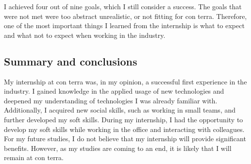 \documentclass[11pt, titlepage, a4paper]{article}
\begin{document}
 I achieved four out of nine goals, which I still consider a success. The goals that were not met were too abstract unrealistic, or not fitting for con terra. Therefore, one of the most important things I learned from the internship is what to expect and what not to expect when working in the industry.

 \subsection{Summary and conclusions}

 My internship at con terra was, in my opinion, a successful first experience in the industry. I gained knowledge in the applied usage of new technologies and deepened my understanding of technologies I was already familiar with. Additionally, I acquired new social skills, such as working in small teams, and further developed my soft skills. During my internship, I had the opportunity to develop my soft skills while working in the office and interacting with colleagues. 
 For my future studies, I do not believe that my internship will provide significant benefits. However, as my studies are coming to an end, it is likely that I will remain at con terra. 

 \clearpage
\end{document}
